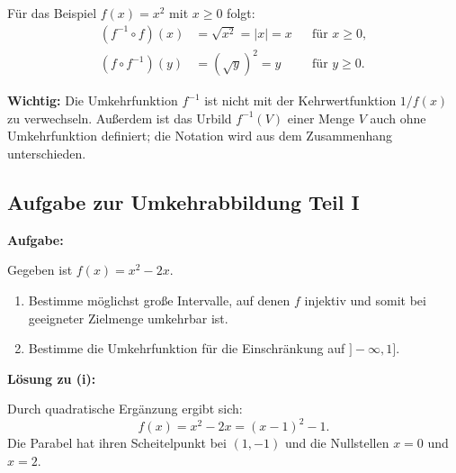 Für das Beispiel $f(x)=x^2$ mit $x\geq 0$ folgt:
\begin{align*}
(f^{-1}\circ f)(x)
&=\sqrt{x^2}=|x|=x
&&\text{für }x\geq 0,\\
(f\circ f^{-1})(y)
&=(\sqrt{y})^2=y
&&\text{für }y\geq 0.
\end{align*}

\textbf{Wichtig:}
Die Umkehrfunktion $f^{-1}$ ist nicht mit der
Kehrwertfunktion $1/f(x)$ zu verwechseln.
Außerdem ist das Urbild $f^{-1}(V)$ einer Menge $V$
auch ohne Umkehrfunktion definiert; die Notation
wird aus dem Zusammenhang unterschieden.

\subsection{Aufgabe zur Umkehrabbildung Teil I}

\textbf{Aufgabe:}

Gegeben ist $f(x)=x^2-2x$.

\begin{enumerate}
\item[(i)] Bestimme möglichst große Intervalle,
auf denen $f$ injektiv und somit bei geeigneter
Zielmenge umkehrbar ist.
\item[(ii)] Bestimme die Umkehrfunktion für
die Einschränkung auf $]-\infty,1]$.
\end{enumerate}

\textbf{Lösung zu (i):}

Durch quadratische Ergänzung ergibt sich:
\[
f(x)=x^2-2x=(x-1)^2-1.
\]
Die Parabel hat ihren Scheitelpunkt bei $(1,-1)$
und die Nullstellen $x=0$ und $x=2$.

\begin{center}
\end{center}

